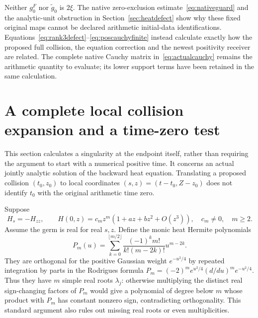 \documentclass[11pt,a4paper]{article}
\theoremstyle{definition}\newtheorem{definition}[theorem]{Definition}\newtheorem{remark}[theorem]{Remark}
\begin{document}
Neither $g_0^F$ nor $\widetilde g_0$ is $2\xi$. The native zero-exclusion estimate~\eqref{eq:nativeguard} and the analytic-unit obstruction in Section~\ref{sec:heatdefect} show why these fixed original maps cannot be declared arithmetic initial-data identifications. Equations~\eqref{eq:rank3defect}--\eqref{eq:poscauchyfinite} instead calculate exactly how the proposed full collision, the equation correction and the newest positivity receiver are related. The complete native Cauchy matrix in~\eqref{eq:actualcauchy} remains the arithmetic quantity to evaluate; its lower support terms have been retained in the same calculation.


\section{A complete local collision expansion and a time-zero test}\label{sec:origin}
This section calculates a singularity at the endpoint itself, rather than requiring the argument to start with a numerical positive time. It concerns an actual jointly analytic solution of the backward heat equation. Translating a proposed collision $(t_0,z_0)$ to local coordinates $(s,z)=(t-t_0,Z-z_0)$ does not identify $t_0$ with the original arithmetic time zero.

Suppose
\begin{equation}
 H_s=-H_{zz},\qquad
 H(0,z)=c_m z^m(1+a z+bz^2+O(z^3)),\quad c_m\ne0,\quad m\ge2.
                                                        \label{eq:localdata}
\end{equation}
Assume the germ is real for real $s,z$. Define the monic heat Hermite polynomials
\begin{equation}
 P_m(u)=\sum_{k=0}^{\lfloor m/2\rfloor}
 \frac{(-1)^km!}{k!(m-2k)!}u^{m-2k}.                    \label{eq:hermite}
\end{equation}
They are orthogonal for the positive Gaussian weight $e^{-u^2/4}$ by repeated integration by parts in the Rodrigues formula
$P_m=(-2)^m e^{u^2/4}(d/du)^m e^{-u^2/4}$. Thus they have $m$ simple real roots $\lambda_j$: otherwise multiplying the distinct real sign-changing factors of $P_m$ would give a polynomial of degree below $m$ whose product with $P_m$ has constant nonzero sign, contradicting orthogonality. This standard argument also rules out missing real roots or even multiplicities.
\end{document}
